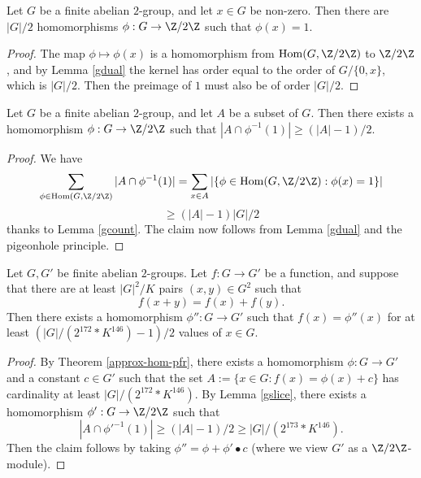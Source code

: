 \begin{lemma}[Counting]\label{gcount}\leanok Let $G$ be a finite abelian $2$-group, and let $x \in G$ be non-zero.  Then there are $|G|/2$ homomorphisms $\phi: G \to \Z/2\Z$ such that $\phi(x) = 1$.
\end{lemma}

\begin{proof} \leanok The map $\phi \mapsto \phi(x)$ is a homomorphism from $\mathrm{Hom}(G,\Z/2\Z)$ to $\Z/2\Z$, and by Lemma \ref{gdual} the kernel has order equal to the order of $G / \{0,x\}$, which is $|G|/2$.  Then the preimage of $1$ must also be of order $|G|/2$.
\end{proof}

\begin{lemma}[Slicing]\label{gslice}\leanok  Let $G$ be a finite abelian $2$-group, and let $A$ be a subset of $G$.  Then there exists a homomorphism $\phi: G \to \Z/2\Z$ such that $|A \cap \phi^{-1}(1)| \geq (|A|-1)/2$.
\end{lemma}

\begin{proof}\leanok  We have
  $$ \sum_{\phi \in \mathrm{Hom}(G,\Z/2\Z)} |A \cap \phi^{-1}(1)| = \sum_{x \in A} |\{ \phi \in \mathrm{Hom}(G,\Z/2\Z): \phi(x) = 1 \}|$$
  $$ \geq (|A|-1) |G|/2$$
  thanks to Lemma \ref{gcount}. The claim now follows from Lemma \ref{gdual} and the pigeonhole principle.
\end{proof}

\begin{corollary}\label{approx-hom-pfr-no-const}\leanok Let $G,G'$ be finite abelian $2$-groups.
  Let $f: G \to G'$ be a function, and suppose that there are at least $|G|^2 / K$ pairs $(x,y) \in G^2$ such that
$$ f(x+y) = f(x) + f(y).$$
Then there exists a homomorphism $\phi'': G \to G'$
such that $f(x) = \phi''(x)$ for at least $(|G| / (2 ^ {172} * K ^ {146}) - 1)/2$ values of $x \in G$.
\end{corollary}

\begin{proof}\leanok By Theorem \ref{approx-hom-pfr}, there exists a homomorphism $\phi: G \to G'$ and a constant $c \in G'$ such that the set $A := \{ x \in G: f(x) = \phi(x) + c\}$ has cardinality at least $|G| / (2 ^ {172} * K ^ {146})$.  By Lemma \ref{gslice}, there exists a homomorphism $\phi': G \to \Z/2\Z$ such that
$$ |A \cap \phi'^{-1}(1)| \geq (|A|-1)/2 \geq |G| / (2 ^ {173} * K ^ {146}).$$
Then the claim follows by taking $\phi'' = \phi + \phi' \bullet c$ (where we view $G'$ as a $\Z/2\Z$-module).
\end{proof}
